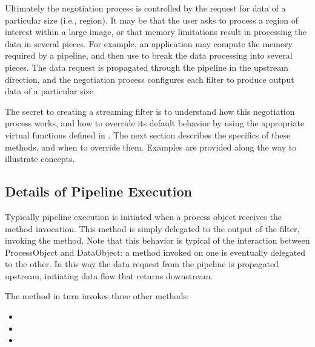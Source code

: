 \begin{figure}
  \par\centering
  \label{fig:DataPipeLineUpdate}
  \par
\end{figure}


Ultimately the negotiation process is controlled by the request for data of a
particular size (i.e., region). It may be that the user asks to process a
region of interest within a large image, or that memory limitations result in
processing the data in several pieces. For example, an application may
compute the memory required by a pipeline, and then use
 to break the data processing into several pieces.
The data request is propagated through the pipeline in the upstream
direction, and the negotiation process configures each filter to produce
output data of a particular size.

The secret to creating a streaming filter is to understand how this
negotiation process works, and how to override its default behavior by using
the appropriate virtual functions defined in . The next
section describes the specifics of these methods, and when to override
them. Examples are provided along the way to illustrate concepts.


\subsection{Details of Pipeline Execution}
\label{sec:DetailsPipelineExecution}

Typically pipeline execution is initiated when a process object receives the
 method invocation. This method is simply delegated to
the output of the filter, invoking the  method. Note that
this behavior is typical of the interaction between ProcessObject and
DataObject: a method invoked on one is eventually delegated to the other. In
this way the data request from the pipeline is propagated upstream,
initiating data flow that returns downstream.

The  method in turn invokes three other methods:

\begin{itemize}
        \item {}
        \item {}
        \item {}
\end{itemize}


